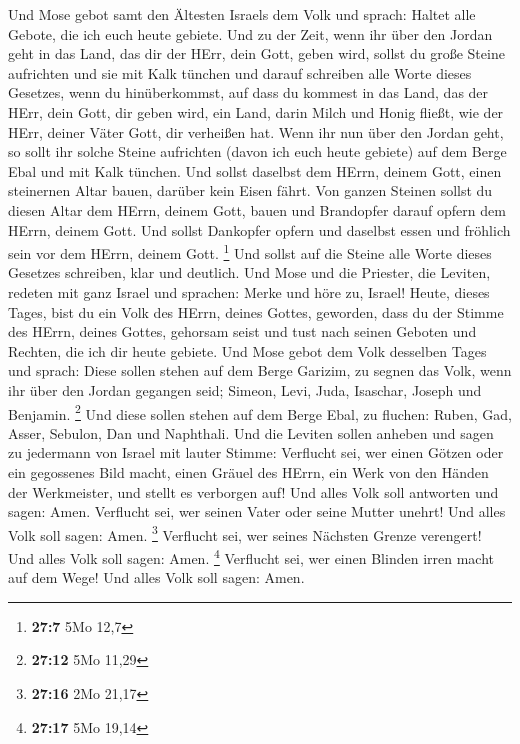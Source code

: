  Und Mose gebot samt den Ältesten Israels dem Volk und
sprach: Haltet alle Gebote, die ich euch heute gebiete. 
Und zu der Zeit, wenn ihr über den Jordan geht in das Land, das dir der
HErr, dein Gott, geben wird, sollst du große Steine aufrichten und sie
mit Kalk tünchen  und darauf schreiben alle Worte dieses
Gesetzes, wenn du hinüberkommst, auf dass du kommest in das Land, das
der HErr, dein Gott, dir geben wird, ein Land, darin Milch und Honig
fließt, wie der HErr, deiner Väter Gott, dir verheißen hat.
 Wenn ihr nun über den Jordan geht, so sollt ihr solche
Steine aufrichten (davon ich euch heute gebiete) auf dem Berge Ebal und
mit Kalk tünchen.  Und sollst daselbst dem HErrn, deinem
Gott, einen steinernen Altar bauen, darüber kein Eisen fährt.
 Von ganzen Steinen sollst du diesen Altar dem HErrn,
deinem Gott, bauen und Brandopfer darauf opfern dem HErrn, deinem Gott.
 Und sollst Dankopfer opfern und daselbst essen und
fröhlich sein vor dem HErrn, deinem Gott. \footnote{\textbf{27:7} 5Mo
  12,7}  Und sollst auf die Steine alle Worte dieses
Gesetzes schreiben, klar und deutlich.  Und Mose und die
Priester, die Leviten, redeten mit ganz Israel und sprachen: Merke und
höre zu, Israel! Heute, dieses Tages, bist du ein Volk des HErrn, deines
Gottes, geworden,  dass du der Stimme des HErrn, deines
Gottes, gehorsam seist und tust nach seinen Geboten und Rechten, die ich
dir heute gebiete.  Und Mose gebot dem Volk desselben
Tages und sprach:  Diese sollen stehen auf dem Berge
Garizim, zu segnen das Volk, wenn ihr über den Jordan gegangen seid;
Simeon, Levi, Juda, Isaschar, Joseph und Benjamin. \footnote{\textbf{27:12}
  5Mo 11,29}  Und diese sollen stehen auf dem Berge Ebal,
zu fluchen: Ruben, Gad, Asser, Sebulon, Dan und Naphthali.
 Und die Leviten sollen anheben und sagen zu jedermann
von Israel mit lauter Stimme:  Verflucht sei, wer einen
Götzen oder ein gegossenes Bild macht, einen Gräuel des HErrn, ein Werk
von den Händen der Werkmeister, und stellt es verborgen auf! Und alles
Volk soll antworten und sagen: Amen.  Verflucht sei, wer
seinen Vater oder seine Mutter unehrt! Und alles Volk soll sagen: Amen.
\footnote{\textbf{27:16} 2Mo 21,17}  Verflucht sei, wer
seines Nächsten Grenze verengert! Und alles Volk soll sagen: Amen.
\footnote{\textbf{27:17} 5Mo 19,14}  Verflucht sei, wer
einen Blinden irren macht auf dem Wege! Und alles Volk soll sagen: Amen.
